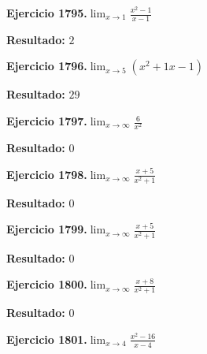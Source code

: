 \documentclass[10pt,a4paper]{article}
\begin{document}
\newpage
\begin{ejbox}
\textbf{Ejercicio 1795.}\quad $\lim_{x\to 1} \frac{x^2-1}{x-1}$
\end{ejbox}

\begin{solbox}
\textbf{Resultado:} \(\displaystyle 2\)
\end{solbox}

\begin{ejbox}
\textbf{Ejercicio 1796.}\quad $\lim_{x\to 5} (x^2 +1x -1)$
\end{ejbox}

\begin{solbox}
\textbf{Resultado:} \(\displaystyle 29\)
\end{solbox}

\begin{ejbox}
\textbf{Ejercicio 1797.}\quad $\lim_{x\to \infty} \frac{6}{x^2}$
\end{ejbox}

\begin{solbox}
\textbf{Resultado:} \(\displaystyle 0\)
\end{solbox}

\newpage
\begin{ejbox}
\textbf{Ejercicio 1798.}\quad $\lim_{x\to \infty} \frac{x + 5}{x^2 + 1}$
\end{ejbox}

\begin{solbox}
\textbf{Resultado:} \(\displaystyle 0\)
\end{solbox}

\begin{ejbox}
\textbf{Ejercicio 1799.}\quad $\lim_{x\to \infty} \frac{x + 5}{x^2 + 1}$
\end{ejbox}

\begin{solbox}
\textbf{Resultado:} \(\displaystyle 0\)
\end{solbox}

\begin{ejbox}
\textbf{Ejercicio 1800.}\quad $\lim_{x\to \infty} \frac{x + 8}{x^2 + 1}$
\end{ejbox}

\begin{solbox}
\textbf{Resultado:} \(\displaystyle 0\)
\end{solbox}

\newpage
\begin{ejbox}
\textbf{Ejercicio 1801.}\quad $\lim_{x\to 4} \frac{x^2-16}{x-4}$
\end{ejbox}
\end{document}
